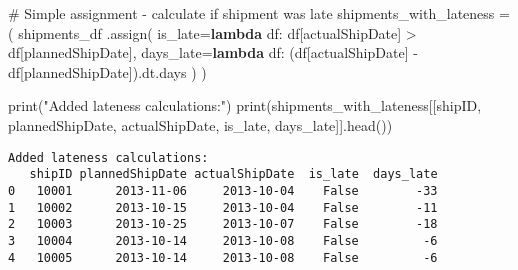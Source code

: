 \documentclass[
  letterpaper,
  DIV=11,
  numbers=noendperiod]{scrartcl}
\newenvironment{Shaded}{\begin{snugshade}}{\end{snugshade}}
\newcommand{\BuiltInTok}[1]{\textcolor[rgb]{0.00,0.23,0.31}{#1}}
\newcommand{\CommentTok}[1]{\textcolor[rgb]{0.37,0.37,0.37}{#1}}
\newcommand{\KeywordTok}[1]{\textcolor[rgb]{0.00,0.23,0.31}{\textbf{#1}}}
\newcommand{\NormalTok}[1]{\textcolor[rgb]{0.00,0.23,0.31}{#1}}
\newcommand{\OperatorTok}[1]{\textcolor[rgb]{0.37,0.37,0.37}{#1}}
\newcommand{\StringTok}[1]{\textcolor[rgb]{0.13,0.47,0.30}{#1}}
\begin{document}
\label{mental_model_1}
\begin{Shaded}
\begin{Highlighting}[]
\CommentTok{\# Simple assignment {-} calculate if shipment was late}
\NormalTok{shipments\_with\_lateness }\OperatorTok{=}\NormalTok{ (}
\NormalTok{    shipments\_df}
\NormalTok{    .assign(}
\NormalTok{        is\_late}\OperatorTok{=}\KeywordTok{lambda}\NormalTok{ df: df[}\StringTok{\textquotesingle{}actualShipDate\textquotesingle{}}\NormalTok{] }\OperatorTok{\textgreater{}}\NormalTok{ df[}\StringTok{\textquotesingle{}plannedShipDate\textquotesingle{}}\NormalTok{],}
\NormalTok{        days\_late}\OperatorTok{=}\KeywordTok{lambda}\NormalTok{ df: (df[}\StringTok{\textquotesingle{}actualShipDate\textquotesingle{}}\NormalTok{] }\OperatorTok{{-}}\NormalTok{ df[}\StringTok{\textquotesingle{}plannedShipDate\textquotesingle{}}\NormalTok{]).dt.days}
\NormalTok{    )}
\NormalTok{)}

\BuiltInTok{print}\NormalTok{(}\StringTok{"Added lateness calculations:"}\NormalTok{)}
\BuiltInTok{print}\NormalTok{(shipments\_with\_lateness[[}\StringTok{\textquotesingle{}shipID\textquotesingle{}}\NormalTok{, }\StringTok{\textquotesingle{}plannedShipDate\textquotesingle{}}\NormalTok{, }\StringTok{\textquotesingle{}actualShipDate\textquotesingle{}}\NormalTok{, }\StringTok{\textquotesingle{}is\_late\textquotesingle{}}\NormalTok{, }\StringTok{\textquotesingle{}days\_late\textquotesingle{}}\NormalTok{]].head())}
\end{Highlighting}
\end{Shaded}

\begin{verbatim}
Added lateness calculations:
   shipID plannedShipDate actualShipDate  is_late  days_late
0   10001      2013-11-06     2013-10-04    False        -33
1   10002      2013-10-15     2013-10-04    False        -11
2   10003      2013-10-25     2013-10-07    False        -18
3   10004      2013-10-14     2013-10-08    False         -6
4   10005      2013-10-14     2013-10-08    False         -6
\end{verbatim}
\end{document}
